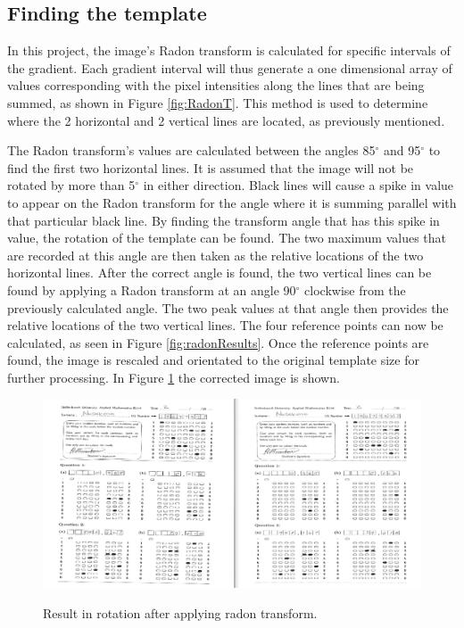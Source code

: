 \subsection{Finding the template}
\label{sec:findTemplate}

In this project, the image's Radon transform is calculated for specific intervals of the gradient. Each gradient interval will thus generate a one dimensional array of values corresponding with the pixel intensities along the lines that are being summed, as shown in Figure \ref{fig:RadonT}. This method is used to determine where the 2 horizontal and 2 vertical lines are located, as previously mentioned.

The Radon transform's values are calculated between the angles 85$^{\circ}$ and 95$^{\circ}$ to find the first two horizontal lines. It is assumed that the image will not be rotated by more than 5$^{\circ}$ in either direction. Black lines will cause a spike in value to appear on the Radon transform for the angle where it is summing parallel with that particular black line. By finding the transform angle that has this spike in value, the rotation of the template can be found. The two maximum values that are recorded at this angle are then taken as the relative locations of the two horizontal lines. After the correct angle is found, the two vertical lines can be found by applying a Radon transform at an angle 90$^{\circ}$ clockwise from the previously calculated angle. The two peak values at that angle then provides the relative locations of the two vertical lines. The four reference points can now be calculated, as seen in Figure \ref{fig:radonResults}. Once the reference points are found, the image is rescaled and orientated to the original template size for further processing. In Figure \ref{fig:rotate} the corrected image is shown.

\begin{figure}
  \centering
  \includegraphics[width=14cm]{Rotation}\\
  \caption{Result in rotation after applying radon transform.}
  \label{fig:rotate}
\end{figure}

